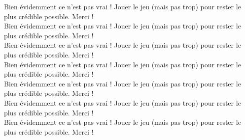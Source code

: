 \documentclass[10pt]{article}
\begin{document}
\begin{multicols}{2}
Bien évidemment ce n'est pas vrai ! Jouer le jeu (mais pas trop) pour rester le plus crédible possible. Merci !\\

Bien évidemment ce n'est pas vrai ! Jouer le jeu (mais pas trop) pour rester le plus crédible possible. Merci !\\

Bien évidemment ce n'est pas vrai ! Jouer le jeu (mais pas trop) pour rester le plus crédible possible. Merci !\\

Bien évidemment ce n'est pas vrai ! Jouer le jeu (mais pas trop) pour rester le plus crédible possible. Merci !\\

Bien évidemment ce n'est pas vrai ! Jouer le jeu (mais pas trop) pour rester le plus crédible possible. Merci !\\

Bien évidemment ce n'est pas vrai ! Jouer le jeu (mais pas trop) pour rester le plus crédible possible. Merci !\\

Bien évidemment ce n'est pas vrai ! Jouer le jeu (mais pas trop) pour rester le plus crédible possible. Merci !\\
\end{multicols}

\noindent\hrulefill
\end{document}
